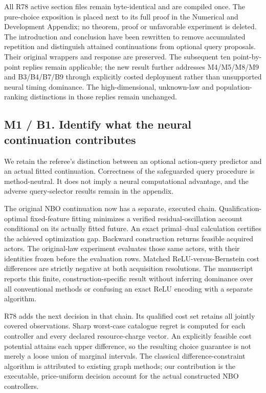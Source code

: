 All R78 active section files remain byte-identical and are compiled
once. The pure-choice exposition is placed next to its full proof in the
Numerical and Development Appendix; no theorem, proof or unfavorable
experiment is deleted. The introduction and conclusion have been
rewritten to remove accumulated repetition and distinguish attained
continuations from optional query proposals. Their original wrappers and
response are preserved. The subsequent ten point-by-point replies remain
applicable; the new result further addresses M4/M5/M8/M9 and B3/B4/B7/B9
through explicitly costed deployment rather than unsupported neural
timing dominance. The high-dimensional, unknown-law and
population-ranking distinctions in those replies remain unchanged.

\hypertarget{m1-b1.-identify-what-the-neural-continuation-contributes}{%
\subsection{M1 / B1. Identify what the neural continuation
contributes}\label{m1-b1.-identify-what-the-neural-continuation-contributes}}

We retain the referee's distinction between an optional action-query
predictor and an actual fitted continuation. Correctness of the
safeguarded query procedure is method-neutral. It does not imply a
neural computational advantage, and the adverse query-selector results
remain in the appendix.

The original NBO continuation now has a separate, executed chain.
Qualification-optimal fixed-feature fitting minimizes a verified
residual-oscillation account conditional on its actually fitted future.
An exact primal--dual calculation certifies the achieved optimization
gap. Backward construction returns feasible acquired actors. The
original-law experiment evaluates those same actors, with their
identities frozen before the evaluation rows. Matched
ReLU-versus-Bernstein cost differences are strictly negative at both
acquisition resolutions. The manuscript reports this finite,
construction-specific result without inferring dominance over all
conventional methods or confusing an exact ReLU encoding with a separate
algorithm.

R78 adds the next decision in that chain. Its qualified cost set retains
all jointly covered observations. Sharp worst-case catalogue regret is
computed for each controller and every declared resource-charge vector.
An explicitly feasible cost potential attains each upper difference, so
the resulting choice guarantee is not merely a loose union of marginal
intervals. The classical difference-constraint algorithm is attributed
to existing graph methods; our contribution is the executable,
price-uniform decision account for the actual constructed NBO
controllers.

